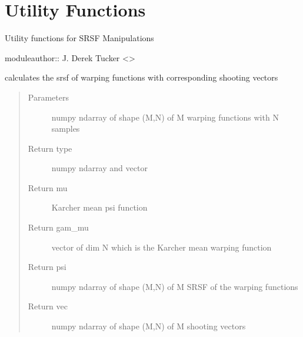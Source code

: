 \documentclass[letterpaper,10pt,english]{sphinxmanual}
\begin{document}
\chapter{Utility Functions}
\label{\detokenize{utility_functions:module-utility_functions}}\label{\detokenize{utility_functions:utility-functions}}\label{\detokenize{utility_functions::doc}}
Utility functions for SRSF Manipulations

moduleauthor:: J. Derek Tucker \textless{}\textgreater{}

\begin{fulllineitems}
\label{\detokenize{utility_functions:utility_functions.SqrtMean}}
calculates the srsf of warping functions with corresponding shooting vectors
\begin{quote}\begin{description}
\item[{Parameters}] \leavevmode
{} \textendash{} numpy ndarray of shape (M,N) of M warping functions
with N samples

\item[{Return type}]  numpy ndarray and vector

\item[{Return mu}] \leavevmode
Karcher mean psi function

\item[{Return gam\_mu}] \leavevmode
vector of dim N which is the Karcher mean warping function

\item[{Return psi}] \leavevmode
numpy ndarray of shape (M,N) of M SRSF of the warping functions

\item[{Return vec}] \leavevmode
numpy ndarray of shape (M,N) of M shooting vectors

\end{description}\end{quote}

\end{fulllineitems}
\end{document}
